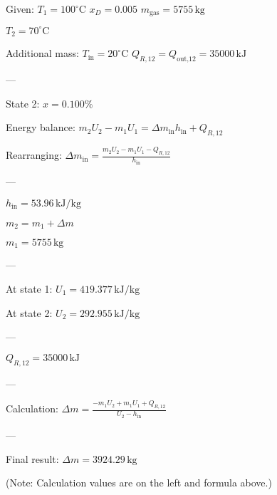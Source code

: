 Given:  
\( T_1 = 100^\circ \text{C} \)  
\( x_D = 0.005 \)  
\( m_{\text{gas}} = 5755 \, \text{kg} \)  

\( T_2 = 70^\circ \text{C} \)  

Additional mass: \( T_{\text{in}} = 20^\circ \text{C} \)  
\( Q_{R,12} = Q_{\text{out,12}} = 35000 \, \text{kJ} \)  

---

State 2: \( x = 0.100 \% \)  

Energy balance:  
\( m_2 U_2 - m_1 U_1 = \Delta m_{\text{in}} h_{\text{in}} + Q_{R,12} \)  

Rearranging:  
\( \Delta m_{\text{in}} = \frac{m_2 U_2 - m_1 U_1 - Q_{R,12}}{h_{\text{in}}} \)  

---

\( h_{\text{in}} = 53.96 \, \text{kJ/kg} \)  

\( m_2 = m_1 + \Delta m \)  

\( m_1 = 5755 \, \text{kg} \)  

---

At state 1:  
\( U_1 = 419.377 \, \text{kJ/kg} \)  

At state 2:  
\( U_2 = 292.955 \, \text{kJ/kg} \)  

---

\( Q_{R,12} = 35000 \, \text{kJ} \)  

---

Calculation:  
\( \Delta m = \frac{-m_1 U_2 + m_1 U_1 + Q_{R,12}}{U_2 - h_{\text{in}}} \)  

---

Final result:  
\( \Delta m = 3924.29 \, \text{kg} \)  

(Note: Calculation values are on the left and formula above.)